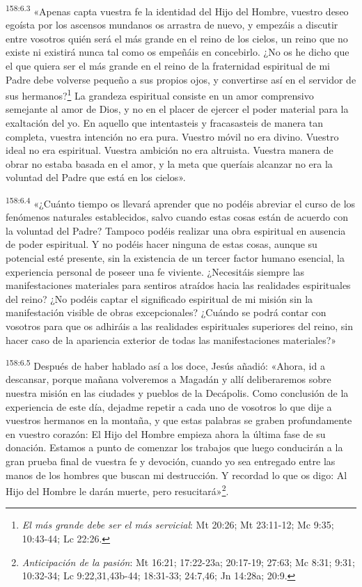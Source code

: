 {\par 
\textsuperscript{158:6.3} «Apenas capta vuestra fe la identidad del Hijo del Hombre, vuestro deseo egoísta por los ascensos mundanos os arrastra de nuevo, y empezáis a discutir entre vosotros quién será el más grande en el reino de los cielos, un reino que no existe ni existirá nunca tal como os empeñáis en concebirlo. ¿No os he dicho que el que quiera ser el más grande en el reino de la fraternidad espiritual de mi Padre debe volverse pequeño a sus propios ojos, y convertirse así en el servidor de sus hermanos?\footnote{\textit{El más grande debe ser el más servicial}: Mt 20:26; Mt 23:11-12; Mc 9:35; 10:43-44; Lc 22:26.} La grandeza espiritual consiste en un amor comprensivo semejante al amor de Dios, y no en el placer de ejercer el poder material para la exaltación del yo. En aquello que intentasteis y fracasasteis de manera tan completa, vuestra intención no era pura. Vuestro móvil no era divino. Vuestro ideal no era espiritual. Vuestra ambición no era altruista. Vuestra manera de obrar no estaba basada en el amor, y la meta que queríais alcanzar no era la voluntad del Padre que está en los cielos».

\par 
\textsuperscript{158:6.4} «¿Cuánto tiempo os llevará aprender que no podéis abreviar el curso de los fenómenos naturales establecidos, salvo cuando estas cosas están de acuerdo con la voluntad del Padre? Tampoco podéis realizar una obra espiritual en ausencia de poder espiritual. Y no podéis hacer ninguna de estas cosas, aunque su potencial esté presente, sin la existencia de un tercer factor humano esencial, la experiencia personal de poseer una fe viviente. ¿Necesitáis siempre las manifestaciones materiales para sentiros atraídos hacia las realidades espirituales del reino? ¿No podéis captar el significado espiritual de mi misión sin la manifestación visible de obras excepcionales? ¿Cuándo se podrá contar con vosotros para que os adhiráis a las realidades espirituales superiores del reino, sin hacer caso de la apariencia exterior de todas las manifestaciones materiales?»

\par 
\textsuperscript{158:6.5} Después de haber hablado así a los doce, Jesús añadió: «Ahora, id a descansar, porque mañana volveremos a Magadán y allí deliberaremos sobre nuestra misión en las ciudades y pueblos de la Decápolis. Como conclusión de la experiencia de este día, dejadme repetir a cada uno de vosotros lo que dije a vuestros hermanos en la montaña, y que estas palabras se graben profundamente en vuestro corazón: El Hijo del Hombre empieza ahora la última fase de su donación. Estamos a punto de comenzar los trabajos que luego conducirán a la gran prueba final de vuestra fe y devoción, cuando yo sea entregado entre las manos de los hombres que buscan mi destrucción. Y recordad lo que os digo: Al Hijo del Hombre le darán muerte, pero resucitará»\footnote{\textit{Anticipación de la pasión}: Mt 16:21; 17:22-23a; 20:17-19; 27:63; Mc 8:31; 9:31; 10:32-34; Lc 9:22,31,43b-44; 18:31-33; 24:7,46; Jn 14:28a; 20:9.}.

}
